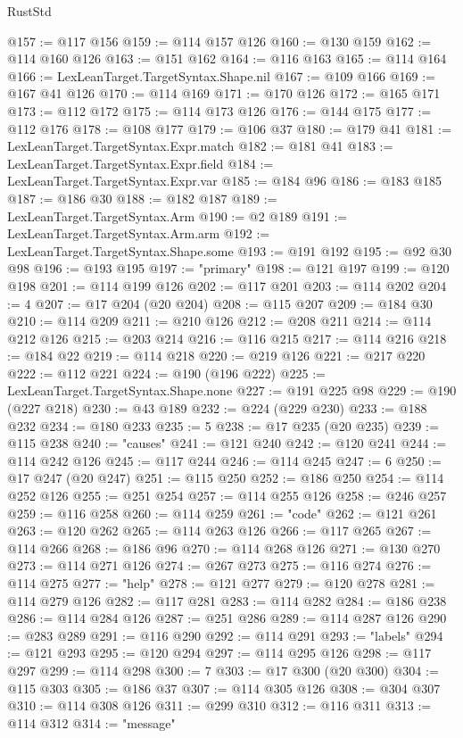 \begin{lexlean}{RustStd}
\begin{coremodule}
@157 := @117 @156
@159 := @114 @157 @126
@160 := @130 @159
@162 := @114 @160 @126
@163 := @151 @162
@164 := @116 @163
@165 := @114 @164
@166 := LexLeanTarget.TargetSyntax.Shape.nil
@167 := @109 @166
@169 := @167 @41 @126
@170 := @114 @169
@171 := @170 @126
@172 := @165 @171
@173 := @112 @172
@175 := @114 @173 @126
@176 := @144 @175
@177 := @112 @176
@178 := @108 @177
@179 := @106 @37
@180 := @179 @41
@181 := LexLeanTarget.TargetSyntax.Expr.match
@182 := @181 @41
@183 := LexLeanTarget.TargetSyntax.Expr.field
@184 := LexLeanTarget.TargetSyntax.Expr.var
@185 := @184 @96
@186 := @183 @185
@187 := @186 @30
@188 := @182 @187
@189 := LexLeanTarget.TargetSyntax.Arm
@190 := @2 @189
@191 := LexLeanTarget.TargetSyntax.Arm.arm
@192 := LexLeanTarget.TargetSyntax.Shape.some
@193 := @191 @192
@195 := @92 @30 @98
@196 := @193 @195
@197 := "primary"
@198 := @121 @197
@199 := @120 @198
@201 := @114 @199 @126
@202 := @117 @201
@203 := @114 @202
@204 := 4
@207 := @17 @204 (@20 @204)
@208 := @115 @207
@209 := @184 @30
@210 := @114 @209
@211 := @210 @126
@212 := @208 @211
@214 := @114 @212 @126
@215 := @203 @214
@216 := @116 @215
@217 := @114 @216
@218 := @184 @22
@219 := @114 @218
@220 := @219 @126
@221 := @217 @220
@222 := @112 @221
@224 := @190 (@196 @222)
@225 := LexLeanTarget.TargetSyntax.Shape.none
@227 := @191 @225 @98
@229 := @190 (@227 @218)
@230 := @43 @189
@232 := @224 (@229 @230)
@233 := @188 @232
@234 := @180 @233
@235 := 5
@238 := @17 @235 (@20 @235)
@239 := @115 @238
@240 := "causes"
@241 := @121 @240
@242 := @120 @241
@244 := @114 @242 @126
@245 := @117 @244
@246 := @114 @245
@247 := 6
@250 := @17 @247 (@20 @247)
@251 := @115 @250
@252 := @186 @250
@254 := @114 @252 @126
@255 := @251 @254
@257 := @114 @255 @126
@258 := @246 @257
@259 := @116 @258
@260 := @114 @259
@261 := "code"
@262 := @121 @261
@263 := @120 @262
@265 := @114 @263 @126
@266 := @117 @265
@267 := @114 @266
@268 := @186 @96
@270 := @114 @268 @126
@271 := @130 @270
@273 := @114 @271 @126
@274 := @267 @273
@275 := @116 @274
@276 := @114 @275
@277 := "help"
@278 := @121 @277
@279 := @120 @278
@281 := @114 @279 @126
@282 := @117 @281
@283 := @114 @282
@284 := @186 @238
@286 := @114 @284 @126
@287 := @251 @286
@289 := @114 @287 @126
@290 := @283 @289
@291 := @116 @290
@292 := @114 @291
@293 := "labels"
@294 := @121 @293
@295 := @120 @294
@297 := @114 @295 @126
@298 := @117 @297
@299 := @114 @298
@300 := 7
@303 := @17 @300 (@20 @300)
@304 := @115 @303
@305 := @186 @37
@307 := @114 @305 @126
@308 := @304 @307
@310 := @114 @308 @126
@311 := @299 @310
@312 := @116 @311
@313 := @114 @312
@314 := "message"

\end{coremodule}
\end{lexlean}
